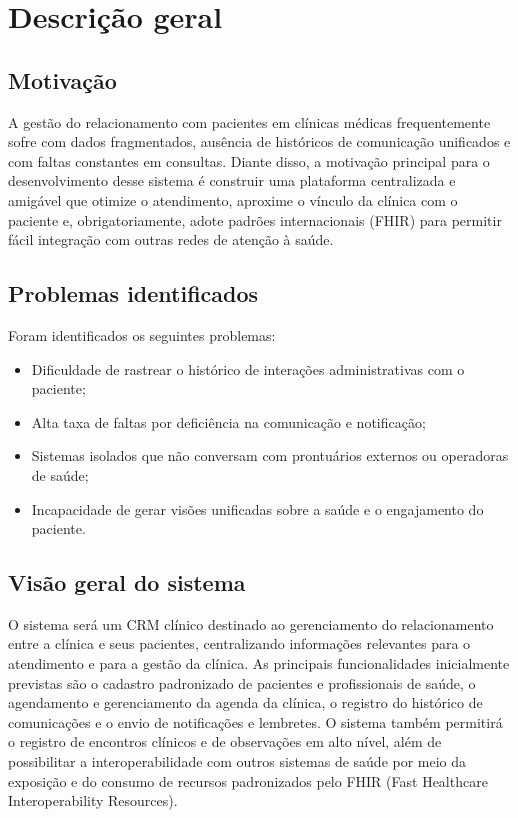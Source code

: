 \section{Descrição geral}

\subsection{Motivação}
A gestão do relacionamento com pacientes em clínicas médicas frequentemente sofre com dados fragmentados, ausência de históricos de comunicação unificados e com faltas constantes em consultas. Diante disso, a motivação principal para o desenvolvimento desse sistema é construir uma plataforma centralizada e amigável que otimize o atendimento, aproxime o vínculo da clínica com o paciente e, obrigatoriamente, adote padrões internacionais (FHIR) para permitir fácil integração com outras redes de atenção à saúde.

\subsection{Problemas identificados}
Foram identificados os seguintes problemas:
\begin{itemize}
    \item Dificuldade de rastrear o histórico de interações administrativas com o paciente;
    \item Alta taxa de faltas por deficiência na comunicação e notificação;
    \item Sistemas isolados que não conversam com prontuários externos ou operadoras de saúde;
    \item Incapacidade de gerar visões unificadas sobre a saúde e o engajamento do paciente.
\end{itemize}

\subsection{Visão geral do sistema}
O sistema será um CRM clínico destinado ao gerenciamento do relacionamento entre a clínica e seus pacientes, centralizando informações relevantes para o atendimento e para a gestão da clínica. As principais funcionalidades inicialmente previstas são o cadastro padronizado de pacientes e profissionais de saúde, o agendamento e gerenciamento da agenda da clínica, o registro do histórico de comunicações e o envio de notificações e lembretes. O sistema também permitirá o registro de encontros clínicos e de observações em alto nível, além de possibilitar a interoperabilidade com outros sistemas de saúde por meio da exposição e do consumo de recursos padronizados pelo FHIR (Fast Healthcare Interoperability Resources).

